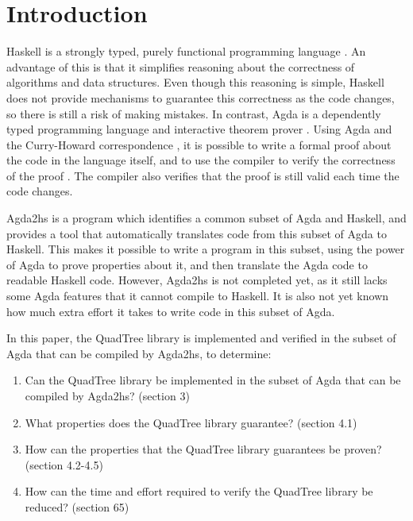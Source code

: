 \section{Introduction}
Haskell is a strongly typed, purely functional programming language \cite{haskell}. An advantage of this is that it simplifies reasoning about the correctness of algorithms and data structures. Even though this reasoning is simple, Haskell does not provide mechanisms to guarantee this correctness as the code changes, so there is still a risk of making mistakes. In contrast, Agda is a dependently typed programming language and interactive theorem prover \cite{agda}.  Using Agda and the Curry-Howard correspondence \cite{chc}, it is possible to write a formal proof about the code in the language itself, and to use the compiler to verify the correctness of the proof \cite{schwaab, van}. The compiler also verifies that the proof is still valid each time the code changes.

Agda2hs \cite{agda2hs} is a program which identifies a common subset of Agda and Haskell, and provides a tool that automatically translates code from this subset of Agda to Haskell. This makes it possible to write a program in this subset, using the power of Agda to prove properties about it, and then translate the Agda code to readable Haskell code. However, Agda2hs is not completed yet, as it still lacks some Agda features that it cannot compile to Haskell. It is also not yet known how much extra effort it takes to write code in this subset of Agda.

In this paper, the QuadTree library is implemented and verified in the subset of Agda that can be compiled by Agda2hs, to determine:
\begin{enumerate}[label=(\roman*)]
	\itemsep-0.2em 
	\item Can the QuadTree library be implemented in the subset of Agda that can be compiled by Agda2hs? (section 3)
	\item What properties does the QuadTree library guarantee? (section 4.1)
	\item How can the properties that the QuadTree library guarantees be proven? (section 4.2-4.5)
	\item How can the time and effort required to verify the QuadTree library be reduced? (section 65)
\end{enumerate}

